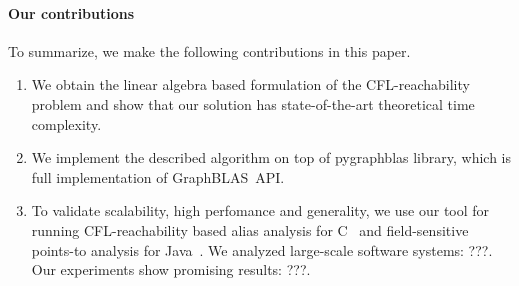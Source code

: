 \paragraph*{Our contributions}
To summarize, we make the following contributions in this paper.
\begin{enumerate}
\item We obtain the  linear algebra based formulation of the CFL-reachability problem and show that our solution has state-of-the-art theoretical time complexity.
\item We implement the described algorithm on top of pygraphblas library, which is full implementation of GraphBLAS~API.
\item To validate scalability, high perfomance and generality, we use our tool for running CFL-reachability based alias analysis for C~\cite{Zheng:2008:DAA:1328897.1328464} and field-sensitive points-to analysis for Java~\cite{10.1145/1103845.1094817}. We analyzed large-scale software systems: ???. Our experiments show promising results: ???.
\end{enumerate}
